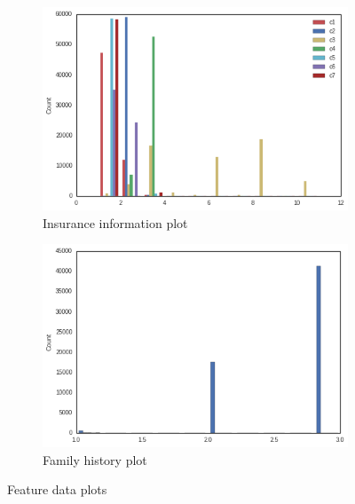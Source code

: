 \begin{figure}[hh!]
  \centering
  \begin{subfigure}[b]{0.4\textwidth}
     \includegraphics[width=\textwidth]{Insuranceinfo.png}
     \caption{Insurance information plot}
     \label{imbalance}
  \end{subfigure}
  \quad
   \begin{subfigure}[b]{0.4\textwidth}
      \includegraphics[width=\textwidth]{Familyhist.png}
      \caption{Family history plot}   
   \end{subfigure}
   \caption{Feature data plots}
\end{figure}

